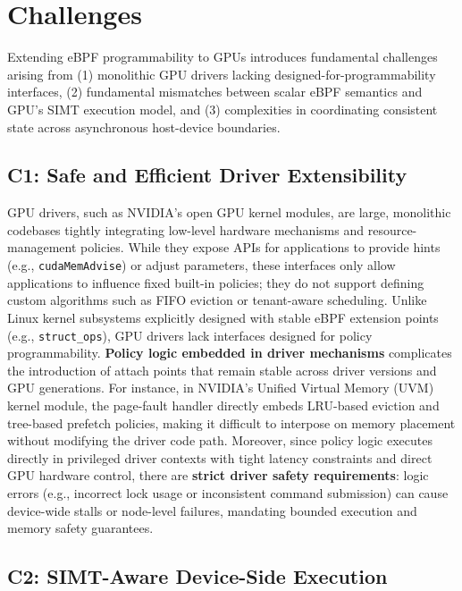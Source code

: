\section{Challenges}
\label{sec:challenges}

Extending eBPF programmability to GPUs introduces fundamental challenges arising from (1) monolithic GPU drivers lacking designed-for-programmability interfaces, (2) fundamental mismatches between scalar eBPF semantics and GPU's SIMT execution model, and (3) complexities in coordinating consistent state across asynchronous host-device boundaries.

\subsection{C1: Safe and Efficient Driver Extensibility}

GPU drivers, such as NVIDIA's open GPU kernel modules, are large, monolithic codebases tightly integrating low-level hardware mechanisms and resource-management policies. While they expose APIs for applications to provide hints (e.g., \texttt{cudaMemAdvise}) or adjust parameters, these interfaces only allow applications to influence fixed built-in policies; they do not support defining custom algorithms such as FIFO eviction or tenant-aware scheduling. Unlike Linux kernel subsystems explicitly designed with stable eBPF extension points (e.g., \texttt{struct\_ops}), GPU drivers lack interfaces designed for policy programmability. \textbf{Policy logic embedded in driver mechanisms} complicates the introduction of attach points that remain stable across driver versions and GPU generations. For instance, in NVIDIA's Unified Virtual Memory (UVM) kernel module, the page-fault handler directly embeds LRU-based eviction and tree-based prefetch policies, making it difficult to interpose on memory placement without modifying the driver code path. Moreover, since policy logic executes directly in privileged driver contexts with tight latency constraints and direct GPU hardware control, there are \textbf{strict driver safety requirements}: logic errors (e.g., incorrect lock usage or inconsistent command submission) can cause device-wide stalls or node-level failures, mandating bounded execution and memory safety guarantees.

\subsection{C2: SIMT-Aware Device-Side Execution}

